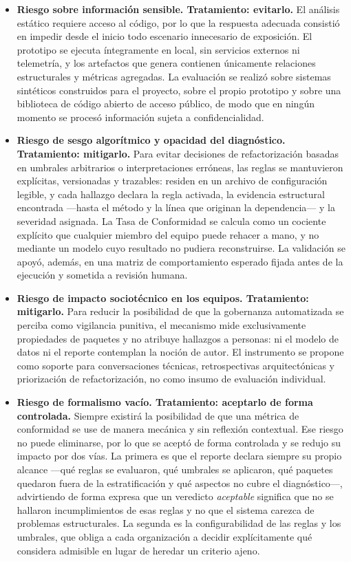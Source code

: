 \begin{itemize}
    \item \textbf{Riesgo sobre información sensible. Tratamiento: evitarlo.} El análisis estático requiere acceso al código, por lo que la respuesta adecuada consistió en impedir desde el inicio todo escenario innecesario de exposición. El prototipo se ejecuta íntegramente en local, sin servicios externos ni telemetría, y los artefactos que genera contienen únicamente relaciones estructurales y métricas agregadas. La evaluación se realizó sobre sistemas sintéticos construidos para el proyecto, sobre el propio prototipo y sobre una biblioteca de código abierto de acceso público, de modo que en ningún momento se procesó información sujeta a confidencialidad.

    \item \textbf{Riesgo de sesgo algorítmico y opacidad del diagnóstico. Tratamiento: mitigarlo.} Para evitar decisiones de refactorización basadas en umbrales arbitrarios o interpretaciones erróneas, las reglas se mantuvieron explícitas, versionadas y trazables: residen en un archivo de configuración legible, y cada hallazgo declara la regla activada, la evidencia estructural encontrada —hasta el método y la línea que originan la dependencia— y la severidad asignada. La Tasa de Conformidad se calcula como un cociente explícito que cualquier miembro del equipo puede rehacer a mano, y no mediante un modelo cuyo resultado no pudiera reconstruirse. La validación se apoyó, además, en una matriz de comportamiento esperado fijada antes de la ejecución y sometida a revisión humana.

    \item \textbf{Riesgo de impacto sociotécnico en los equipos. Tratamiento: mitigarlo.} Para reducir la posibilidad de que la gobernanza automatizada se perciba como vigilancia punitiva, el mecanismo mide exclusivamente propiedades de paquetes y no atribuye hallazgos a personas: ni el modelo de datos ni el reporte contemplan la noción de autor. El instrumento se propone como soporte para conversaciones técnicas, retrospectivas arquitectónicas y priorización de refactorización, no como insumo de evaluación individual.

    \item \textbf{Riesgo de formalismo vacío. Tratamiento: aceptarlo de forma controlada.} Siempre existirá la posibilidad de que una métrica de conformidad se use de manera mecánica y sin reflexión contextual. Ese riesgo no puede eliminarse, por lo que se aceptó de forma controlada y se redujo su impacto por dos vías. La primera es que el reporte declara siempre su propio alcance —qué reglas se evaluaron, qué umbrales se aplicaron, qué paquetes quedaron fuera de la estratificación y qué aspectos no cubre el diagnóstico—, advirtiendo de forma expresa que un veredicto \textit{aceptable} significa que no se hallaron incumplimientos de esas reglas y no que el sistema carezca de problemas estructurales. La segunda es la configurabilidad de las reglas y los umbrales, que obliga a cada organización a decidir explícitamente qué considera admisible en lugar de heredar un criterio ajeno.


\end{itemize}
